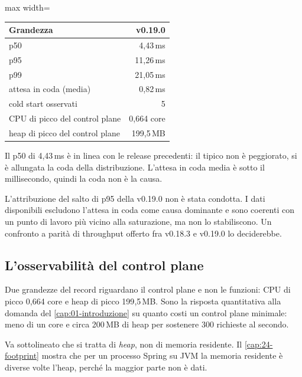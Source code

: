 \begin{center}
\small
\begin{adjustbox}{max width=\textwidth}
\begin{tabular}{@{}lr@{}}
\toprule
\textbf{Grandezza} & \textbf{v0.19.0} \\
\midrule
p50 & 4{,}43\,ms \\
p95 & 11{,}26\,ms \\
p99 & 21{,}05\,ms \\
attesa in coda (media) & 0{,}82\,ms \\
cold start osservati & 5 \\
CPU di picco del control plane & 0{,}664 core \\
heap di picco del control plane & 199{,}5\,MB \\
\bottomrule
\end{tabular}
\end{adjustbox}
\end{center}

Il p50 di 4{,}43\,ms \`e in linea con le release precedenti: il tipico non \`e
peggiorato, si \`e allungata la coda della distribuzione. L'attesa in coda media
\`e sotto il millisecondo, quindi la coda non \`e la causa.

\begin{damisurare}
L'attribuzione del salto di p95 della v0.19.0 non \`e stata condotta. I dati
disponibili escludono l'attesa in coda come causa dominante e sono coerenti con
un punto di lavoro pi\`u vicino alla saturazione, ma non lo stabiliscono. Un
confronto a parit\`a di throughput offerto fra v0.18.3 e v0.19.0 lo
deciderebbe.
\end{damisurare}

\subsection{L'osservabilit\`a del control plane}

Due grandezze del record riguardano il control plane e non le funzioni: CPU di
picco 0{,}664 core e heap di picco 199{,}5\,MB. Sono la risposta quantitativa
alla domanda del \cref{cap:01-introduzione} su quanto costi un control plane
minimale: meno di un core e circa 200\,MB di heap per sostenere 300 richieste al
secondo.

Va sottolineato che si tratta di \emph{heap}, non di memoria residente. Il
\cref{cap:24-footprint} mostra che per un processo Spring su JVM la memoria
residente \`e diverse volte l'heap, perch\'e la maggior parte non \`e dati.

